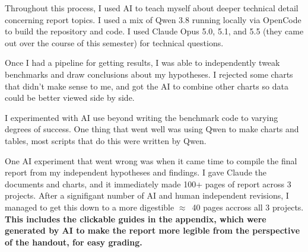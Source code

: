 \documentclass{article}
\begin{document}
Throughout this process, I used AI to teach myself about deeper technical detail concerning report topics. I used a mix of Qwen 3.8 running locally via OpenCode to build the repository and code. I used Claude Opus 5.0, 5.1, and 5.5 (they came out over the course of this semester) for technical questions.

Once I had a pipeline for getting results, I was able to independently tweak benchmarks and draw conclusions about my hypotheses. I rejected some charts that didn't make sense to me, and got the AI to combine other charts so data could be better viewed side by side.

I experimented with AI use beyond writing the benchmark code to varying degrees of success. One thing that went well was using Qwen to make charts and tables, most scripts that do this were written by Qwen.

One AI experiment that went wrong was when it came time to compile the final report from my independent hypotheses and findings. I gave Claude the documents and charts, and it immediately made 100+ pages of report across 3 projects. After a signifigant number of AI and human independent revisions, I managed to get this down to a more digestible $\approx$~40 pages accross all 3 projects. \textbf{This includes the clickable guides in the appendix, which were generated by AI to make the report more legible from the perspective of the handout, for easy grading.}
\end{document}

